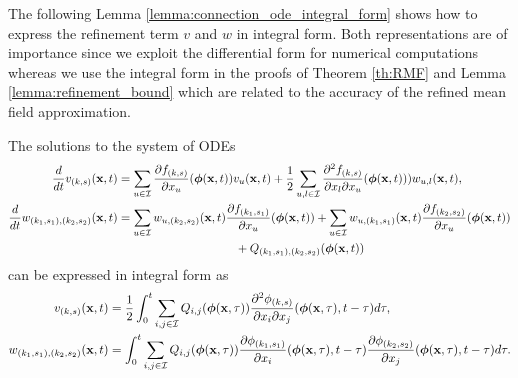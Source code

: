 \documentclass[acmsmall]{acmart}
\newcommand\bx{\mathbf{x}}
\newcommand\bdrift{f}
\newcommand\bphi{\text{\boldmath$\phi$}}
\newcommand\calI{\mathcal{I}}
\newcommand{\dd}[3]{ \frac{\partial^2 #1 }{ \partial x_{#2} \partial x_{#3}}}
\begin{document}
The following Lemma \ref{lemma:connection_ode_integral_form} shows how to express the refinement term $v$ and $w$ in integral form. Both representations are of importance since we exploit the differential form for numerical computations whereas we use the integral form in the proofs of Theorem \ref{th:RMF} and Lemma \ref{lemma:refinement_bound} which are related to the accuracy of the refined mean field approximation. 
\begin{lemma}
  \label{lemma:connection_ode_integral_form}
  The solutions to the system of ODEs 
  \begin{align*}
    \frac{d}{dt}{v}_{(k,s)}(\bx,t) &= \sum_{u \in \calI} \frac{\partial \bdrift_{(k,s)}}{\partial x_u}(\bphi(\bx,t)) v_{u}(\bx,t) + \frac{1}{2}\sum_{u,l \in \calI} \frac{\partial^2\bdrift_{(k,s)}}{\partial x_l \partial x_u}(\bphi(\bx,t)))w_{u,l}(\bx,t), \\
    \frac{d}{dt}{w}_{(k_1,s_1),(k_2,s_2)}(\bx,t) &= \sum_{u \in \calI}w_{u,(k_2,s_2)}(\bx,t) \frac{\partial \bdrift_{(k_1,s_1)}}{\partial x_{u}}(\bphi(\bx,t)) + \sum_{u \in \calI}w_{u,(k_1,s_1)}(\bx,t) \frac{\partial \bdrift_{(k_2,s_2)}}{\partial x_u}(\bphi(\bx,t)) \\
    & \phantom{\dot{w}_{(k_1,s_1),(k_2,s_2)}(\bx,t) == } + Q_{(k_1,s_1),(k_2,s_2)}(\bphi(\bx,t))
  \end{align*}
  can be expressed in integral form as
  \begin{align*}
    v_{(k,s)}(\bx, t) & = \frac{1}{2}\int_0^t\sum_{i,j\in\calI} Q_{i,j}(\bphi(\bx,\tau))\dd{\phi_{(k,s)}}{i}{j}(\bphi(\bx,\tau),t-\tau)d\tau, \\
    w_{(k_1,s_1),(k_2,s_2)}(\bx, t) & = \int_0^t \sum_{i,j \in \calI} Q_{i,j}(\bphi(\bx,\tau))\frac{\partial \phi_{(k_1,s_1)}}{\partial x_i}(\bphi(\bx,\tau),t-\tau) \frac{\partial \phi_{(k_2,s_2)}}{\partial x_j}(\bphi(\bx,\tau),t-\tau) d\tau.
  \end{align*}

\end{lemma}
\end{document}
